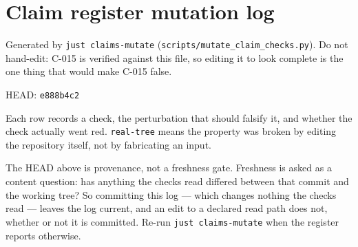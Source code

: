 \documentclass[
]{article}
\author{}
\date{}
\begin{document}
\hypertarget{claim-register-mutation-log}{%
\section{Claim register mutation
log}\label{claim-register-mutation-log}}

Generated by \texttt{just\ claims-mutate}
(\texttt{scripts/mutate\_claim\_checks.py}). Do not hand-edit: C-015 is
verified against this file, so editing it to look complete is the one
thing that would make C-015 false.

HEAD: \texttt{e888b4c2}

Each row records a check, the perturbation that should falsify it, and
whether the check actually went red. \texttt{real-tree} means the
property was broken by editing the repository itself, not by fabricating
an input.

The HEAD above is provenance, not a freshness gate. Freshness is asked
as a content question: has anything the checks read differed between
that commit and the working tree? So committing this log --- which
changes nothing the checks read --- leaves the log current, and an edit
to a declared read path does not, whether or not it is committed. Re-run
\texttt{just\ claims-mutate} when the register reports otherwise.
\end{document}
